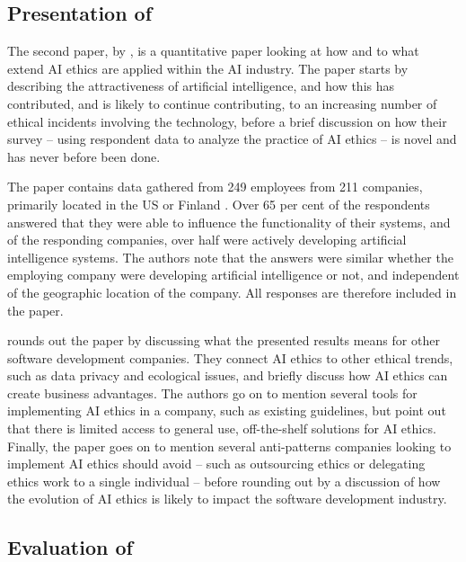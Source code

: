 \subsection[Presentation of Vakkuri et al. (2020)]{Presentation of \textcite{Vakkuri_2020}}
The second paper,  by \textcite{Vakkuri_2020}, is a quantitative paper looking at how and to what extend AI ethics are applied within the AI industry. The paper starts by describing the attractiveness of artificial intelligence, and how this has contributed, and is likely to continue contributing, to an increasing number of ethical incidents involving the technology, before a brief discussion on how their survey -- using respondent data to analyze the practice of AI ethics -- is novel and has never before been done.

The paper contains data gathered from 249 employees from 211 companies, primarily located in the US or Finland \parencite[p.52]{Vakkuri_2020}. Over 65 per cent of the respondents answered that they were able to influence the functionality of their systems, and of the responding companies, over half were actively developing artificial intelligence systems. The authors note that the answers were similar whether the employing company were developing artificial intelligence or not, and independent of the geographic location of the company. All responses are therefore included in the paper.

\textcite{Vakkuri_2020} rounds out the paper by discussing what the presented results means for other software development companies. They connect AI ethics to other ethical trends, such as data privacy and ecological issues, and briefly discuss how AI ethics can create business advantages. The authors go on to mention several tools for implementing AI ethics in a company, such as existing guidelines, but point out that there is limited access to general use, off-the-shelf solutions for AI ethics. Finally, the paper goes on to mention several anti-patterns companies looking to implement AI ethics should avoid -- such as outsourcing ethics or delegating ethics work to a single individual -- before rounding out by a discussion of how the evolution of AI ethics is likely to impact the software development industry.

\subsection[Evaluation of Vakkuri et al. (2020)]{Evaluation of \textcite{Vakkuri_2020}}






